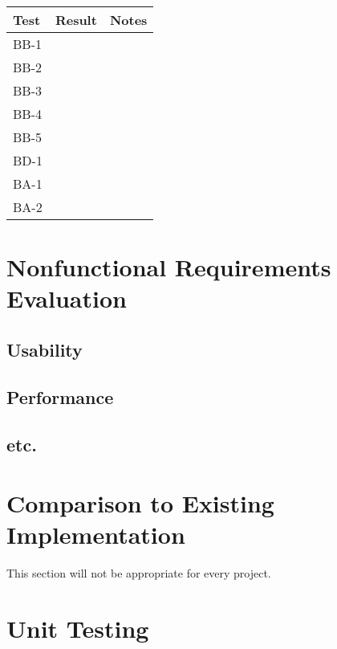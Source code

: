 \documentclass[12pt, titlepage]{article}
\begin{document}
\begin{table}[H]
  \centering
      \setlength{\leftmargini}{0.4cm}
      \begin{tabular}{| >{\centering\arraybackslash}m{3cm} | 
        >{\centering\arraybackslash}m{4cm} | 
        >{\centering\arraybackslash}m{6cm} |}
      \hline
      \rowcolor[gray]{0.9}
      Test & Result & Notes\\
      \hline
      BB-1 &  & \\
      \hline
      BB-2 &  & \\
      \hline
      BB-3 &  & \\
      \hline
      BB-4 &  & \\
      \hline
      BB-5 &  & \\
      \hline
      BD-1 &  & \\
      \hline
      BA-1 &  & \\
      \hline
      BA-2 &  & \\
      \hline
      \end{tabular}
  \label{Table}
  \end{table}

\section{Nonfunctional Requirements Evaluation}

\subsection{Usability}
		
\subsection{Performance}

\subsection{etc.}
	
\section{Comparison to Existing Implementation}	

This section will not be appropriate for every project.

\section{Unit Testing}
\end{document}
